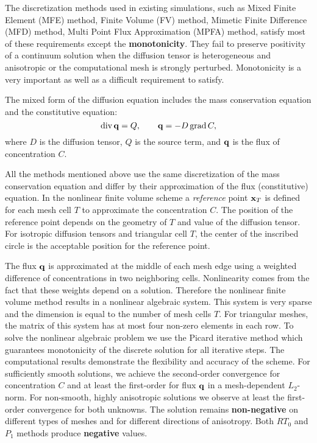 \documentclass{report}
\begin{document}
The discretization
methods used in existing simulations, such as Mixed Finite Element (MFE)
method, Finite Volume (FV) method,
Mimetic Finite Difference (MFD) method, Multi Point Flux Approximation (MPFA) method,
satisfy most of these requirements except the {\bf monotonicity}. They
fail to preserve positivity of a
continuum solution when the diffusion tensor is heterogeneous and
anisotropic or the computational mesh is strongly
perturbed.
Monotonicity is a very important as well as a difficult requirement to satisfy.

The mixed form of the diffusion equation includes the mass conservation equation
and the constitutive equation:
\begin{equation}
{\rm div} \, {\bf q} = Q, \qquad {\bf q} = - D\, {\rm grad}\, C,
\nonumber
\end{equation}
where $ D$ is the diffusion tensor, $Q$ is the source term, and $\bf q$ is the
flux of concentration $C$.


All the methods mentioned above use the same discretization of the mass
conservation equation
and differ by their approximation of the flux (constitutive) equation.
In the nonlinear finite volume scheme a {\it reference} point ${\bf x}_T$ is defined for
each mesh cell $T$ to approximate the concentration $C$. The position of
the reference point
depends on the geometry of $T$ and value of the diffusion tensor.
For isotropic diffusion tensors and triangular cell $T$, the center of
the inscribed circle
is the acceptable position for the reference point.

The flux $\bf q$ is approximated at the middle of each mesh
edge using a weighted difference of concentrations in two neighboring
cells. Nonlinearity comes from the fact that these weights
depend on a solution. Therefore the nonlinear finite volume method
results in a nonlinear algebraic system.
This system is very sparse and the dimension is equal to the number of mesh cells $T$.
For triangular meshes, the matrix of this system has at most four
non-zero elements in each row.
To solve the nonlinear algebraic problem we use the Picard iterative
method which guarantees monotonicity of the
discrete solution for all iterative steps.
The computational results demonstrate the flexibility and accuracy of the scheme.
For sufficiently smooth solutions, we achieve the
second-order convergence for concentration $C$ and at least the first-order for flux
${\bf q}$ in a mesh-dependent $L_2$-norm. For non-smooth, highly anisotropic solutions
we observe at least the first-order convergence for both unknowns.
The solution remains {\bf non-negative} on different types of meshes and for different
directions of anisotropy.
Both $RT_0$ and $P_1$ methods produce {\bf negative} values.
\end{document}
